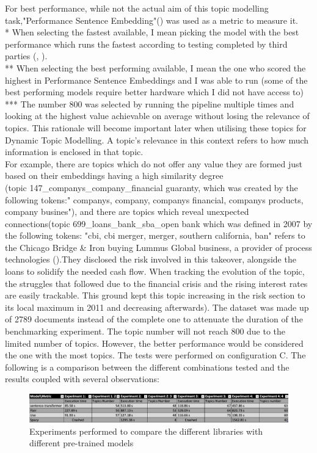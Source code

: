 \documentclass[12pt,MSc,a4paper,oneside]{muthesis}
\begin{document}
For best performance, while not the actual aim of this topic modelling task,"Performance Sentence Embedding"(\cite{DBLP:journals/corr/abs-2101-10642}) was used as a metric to measure it. \\
* When selecting the fastest available, I mean picking the model with the best performance which runs the fastest according to testing completed by third parties (\cite{grootendorst2020bertopic}, \cite{sbert-models}). \\
** When selecting the best performing available, I mean the one who scored the highest in Performance Sentence Embeddings and I was able to run (some of the best performing models require better hardware which I did not have access to) \\
*** The number 800 was selected by running the pipeline multiple times and looking at the highest value achievable on average without losing the relevance of topics. This rationale will become important later when utilising these topics for Dynamic Topic Modelling. A topic's relevance in this context refers to how much information is enclosed in that topic. \\
For example, there are topics which do not offer any value they are formed just based on their embeddings having a high similarity degree \\ (topic 147\_companys\_company\_financial guaranty, which was created by the following tokens:" companys, company, companys financial, companys products, company busines"), and there are topics which reveal unexpected connections(topic 699\_loans\_bank\_sba\_open bank which was defined in 2007 by the following tokens: "cbi, cbi merger, merger, southern california, ban" refers to the Chicago Bridge & Iron buying Lummus Global business, a provider of process technologies (\cite{topic-modelling-example}).They disclosed the risk involved in this takeover, alongside the loans to solidify the needed cash flow. When tracking the evolution of the topic, the struggles that followed due to the financial crisis and the rising interest rates are easily trackable. This ground kept this topic increasing in the risk section to its local maximum in 2011 and decreasing afterwards).
The dataset was made up of 2789 documents instead of the complete one to attenuate the duration of the benchmarking experiment. The topic number will not reach 800 due to the limited number of topics. However, the better performance would be considered the one with the most topics. The tests were performed on configuration C.
The following is a comparison between the different combinations tested and the results coupled with several observations:
\begin{figure}[h]
    \centering
    \includegraphics[scale=0.37]{embeddings_comparasion.png}
    \caption{Experiments performed to compare the different libraries with different pre-trained models}
\end{figure}
\end{document}
